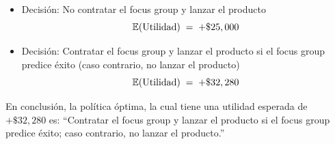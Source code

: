 \documentclass[ a4paper, twoside, 11pt]{article}
\begin{document}
\begin{problem}
\begin{itemize}
\item Decisi\'on: No contratar el focus group y lanzar el producto
\[
\mathbb{E}(\text{Utilidad}) \; = \; +\$25,000
\]

\item Decisi\'on: Contratar el focus group y lanzar el producto si el focus group predice \'exito (caso contrario, no lanzar el producto)
\[
\mathbb{E}(\text{Utilidad}) \; = \; +\$32,280
\]

\end{itemize}

En conclusi\'on, la pol\'itica \'optima, la cual tiene una utilidad esperada de $+\$32,280$ es: \linebreak ``Contratar el focus group y lanzar el producto si el focus group predice \'exito; caso contrario, no lanzar el producto.'' 

\end{problem}
\vspace{\baselineskip}
\end{document}
